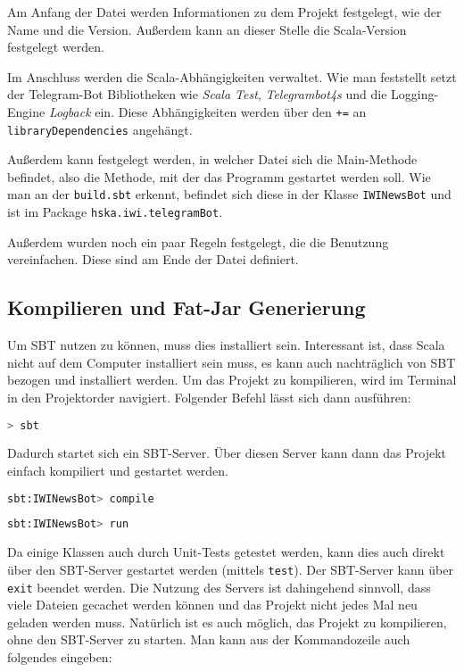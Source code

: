 Am Anfang der Datei werden Informationen zu dem Projekt festgelegt, wie der Name und die Version. Außerdem kann an dieser Stelle die Scala-Version festgelegt werden.

Im Anschluss werden die Scala-Abhängigkeiten verwaltet. Wie man feststellt setzt der Telegram-Bot Bibliotheken wie \emph{Scala Test}, \emph{Telegrambot4s} und die Logging-Engine \emph{Logback} ein. Diese Abhängigkeiten werden über den \texttt{+=} an \texttt{libraryDependencies} angehängt.

Außerdem kann festgelegt werden, in welcher Datei sich die Main-Methode befindet, also die Methode, mit der das Programm gestartet werden soll. Wie man an der \texttt{build.sbt} erkennt, befindet sich diese in der Klasse \texttt{IWINewsBot} und ist im Package \texttt{hska\allowbreak.iwi\allowbreak.telegramBot}.

Außerdem wurden noch ein paar Regeln festgelegt, die die Benutzung vereinfachen. Diese sind am Ende der Datei definiert.

\subsection{Kompilieren und Fat-Jar Generierung}
Um SBT nutzen zu können, muss dies installiert sein. Interessant ist, dass Scala nicht auf dem Computer installiert sein muss, es kann auch nachträglich von SBT bezogen und installiert werden. Um das Projekt zu kompilieren, wird im Terminal in den Projektorder navigiert. Folgender Befehl lässt sich dann ausführen:

\begin{lstlisting}[language=bash]
> sbt
\end{lstlisting}

Dadurch startet sich ein SBT-Server. Über diesen Server kann dann das Projekt einfach kompiliert und gestartet werden.

\begin{lstlisting}[language=bash]
sbt:IWINewsBot> compile
\end{lstlisting}

\begin{lstlisting}[language=bash]
sbt:IWINewsBot> run
\end{lstlisting}

Da einige Klassen auch durch Unit-Tests getestet werden, kann dies auch direkt über den SBT-Server gestartet werden (mittels \texttt{test}). Der SBT-Server kann über \texttt{exit} beendet werden. Die Nutzung des Servers ist dahingehend sinnvoll, dass viele Dateien gecachet werden können und das Projekt nicht jedes Mal neu geladen werden muss. Natürlich ist es auch möglich, das Projekt zu kompilieren, ohne den SBT-Server zu starten. Man kann aus der Kommandozeile auch folgendes eingeben:

